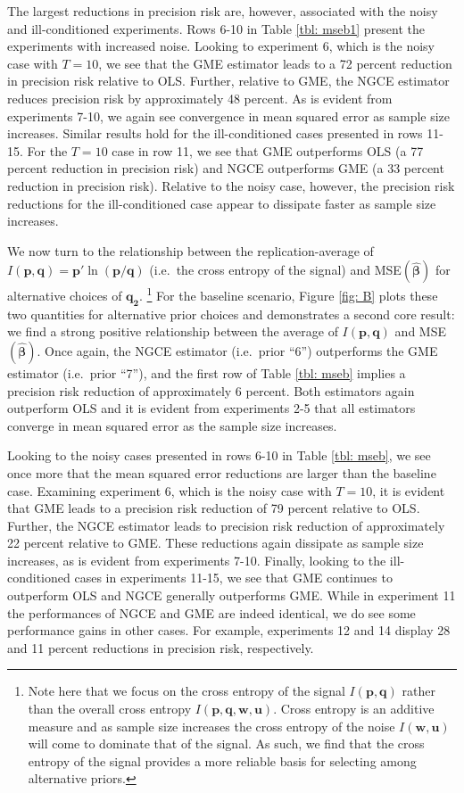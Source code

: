 \documentclass[english]{article}
\begin{document}
The largest reductions in precision risk are, however, associated with the noisy
and ill-conditioned experiments.
Rows 6-10 in Table \ref{tbl: mseb1} present the experiments with increased 
noise. 
Looking to experiment 6, which is the noisy case with $T=10$, we see that 
the GME estimator leads to a 72 percent reduction in precision risk relative 
to OLS.
Further, relative to GME, the NGCE estimator reduces precision risk by 
approximately 48 percent. 
As is evident from experiments 7-10, we again see convergence in mean 
squared error as sample size increases.
Similar results hold for the ill-conditioned cases presented in rows 11-15.
For the $T=10$ case in row 11, we see that GME outperforms OLS 
(a 77 percent reduction in precision risk) and NGCE outperforms GME 
(a 33 percent reduction in precision risk).
Relative to the noisy case, however, the precision risk reductions for the 
ill-conditioned case appear to dissipate faster as sample size increases.

We now turn to the relationship between the replication-average of 
$I(\mathbf{p}, \mathbf{q}) = \mathbf{p}'\ln (\mathbf{p}/
\mathbf{q})$ (i.e.\ the cross entropy of the signal) and 
MSE$(\hat{\mathbf{\beta}})$ for alternative choices of $\mathbf{q_2}$.%
\footnote{Note here that we focus on the cross entropy of the signal 
$I(\mathbf{p}, \mathbf{q})$ rather than the overall cross entropy 
$I(\mathbf{p}, \mathbf{q}, \mathbf{w}, \mathbf{u})$.
Cross entropy is an additive measure and as sample size increases the cross
entropy of the noise $I(\mathbf{w}, \mathbf{u})$ will come to dominate
that of the signal.
As such, we find that the cross entropy of the signal provides a more reliable
basis for selecting among alternative priors.}
For the baseline scenario, Figure \ref{fig: B} plots these two quantities for 
alternative prior choices and demonstrates a second core result: we find a 
strong positive relationship between the average of $I(\mathbf{p}, 
\mathbf{q})$ and MSE$(\hat{\mathbf{\beta}})$.
Once again, the NGCE estimator (i.e.\ prior ``6'') outperforms the 
GME estimator (i.e.\ prior ``7''), and the first row of Table 
\ref{tbl: mseb} implies a precision risk reduction of approximately 6 
percent.
Both estimators again outperform OLS and it is evident from 
experiments 2-5 that all estimators converge in mean squared error as 
the sample size increases.

Looking to the noisy cases presented in rows 6-10 in Table 
\ref{tbl: mseb}, we see once more that the mean squared error 
reductions are larger than the baseline case. 
Examining experiment 6, which is the noisy case with $T=10$, it is 
evident that GME leads to a precision risk reduction of 79 percent
relative to OLS. 
Further, the NGCE estimator leads to precision risk reduction of 
approximately 22 percent relative to GME.
These reductions again dissipate as sample size increases, as is evident 
from experiments 7-10.
Finally, looking to the ill-conditioned cases in experiments 11-15, we see 
that GME continues to outperform OLS and NGCE generally outperforms
GME. 
While in experiment 11 the performances of NGCE and GME are indeed
identical, we do see some performance gains in other cases.
For example, experiments 12 and 14 display 28 and 11 percent reductions 
in precision risk, respectively.
\end{document}
